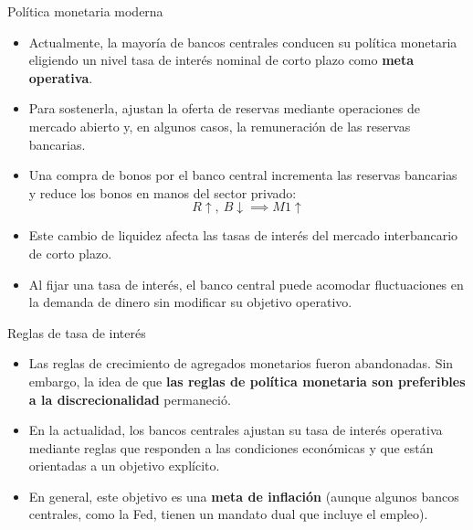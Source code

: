 \documentclass[aspectratio=169,11pt]{beamer}
\newcommand{\cidehighlight}[1]{\textcolor{CIDEBlue}{\bfseries #1}}
\begin{document}
\begin{frame}{Política monetaria moderna}
  \begin{itemize}
    \setlength{\itemsep}{0.55em}

    \item Actualmente, la mayoría de bancos centrales conducen su política monetaria eligiendo un nivel tasa de interés nominal de corto plazo como \cidehighlight{meta operativa}.

    \item Para sostenerla, ajustan la oferta de reservas mediante operaciones de mercado abierto y, en algunos casos, la remuneración de las reservas bancarias.

    \item Una compra de bonos por el banco central incrementa las reservas bancarias y reduce los bonos en manos del sector privado:
    \[
      R\uparrow, \ B\downarrow \implies M1 \uparrow
    \]

    \item Este cambio de liquidez afecta las tasas de interés del mercado interbancario de corto plazo.

    \item Al fijar una tasa de interés, el banco central puede acomodar fluctuaciones en la demanda de dinero sin modificar su objetivo operativo.

  \end{itemize}
\end{frame}


\begin{frame}{Reglas de tasa de interés}
  \begin{itemize}
  \setlength{\itemsep}{0.55em}
  
    \item Las reglas de crecimiento de agregados monetarios fueron abandonadas. Sin embargo, la idea de que \cidehighlight{las reglas de política monetaria son preferibles a la discrecionalidad} permaneció.

    \item En la actualidad, los bancos centrales ajustan su tasa de interés operativa mediante reglas que responden a las condiciones económicas y que están orientadas a un objetivo explícito.

    \item En general, este objetivo es una \cidehighlight{meta de inflación} (aunque algunos bancos centrales, como la Fed, tienen un mandato dual que incluye el empleo).
  \end{itemize}
\end{frame}
\end{document}
